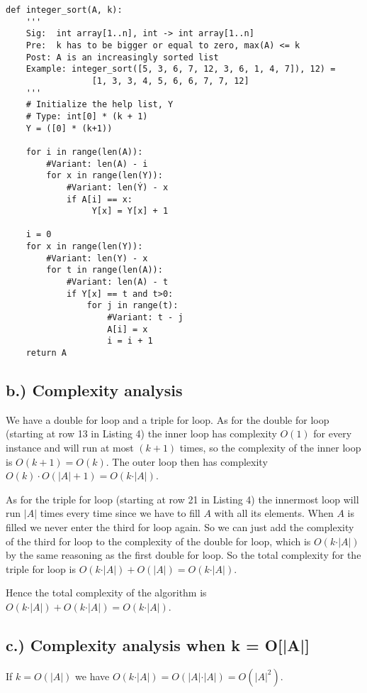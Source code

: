 \documentclass{article}
\begin{document}
\begin{lstlisting}[caption={Code for Integer Sort},captionpos=b]
def integer_sort(A, k):
    '''
    Sig:  int array[1..n], int -> int array[1..n]
    Pre:  k has to be bigger or equal to zero, max(A) <= k
    Post: A is an increasingly sorted list 
    Example: integer_sort([5, 3, 6, 7, 12, 3, 6, 1, 4, 7]), 12) = 
                 [1, 3, 3, 4, 5, 6, 6, 7, 7, 12]
    '''
    # Initialize the help list, Y
    # Type: int[0] * (k + 1)
    Y = ([0] * (k+1))
 
    for i in range(len(A)):
        #Variant: len(A) - i
        for x in range(len(Y)):
            #Variant: len(Ý) - x
            if A[i] == x:
                 Y[x] = Y[x] + 1

    i = 0
    for x in range(len(Y)):
        #Variant: len(Y) - x
        for t in range(len(A)):
            #Variant: len(A) - t
            if Y[x] == t and t>0:
                for j in range(t):
                    #Variant: t - j
                    A[i] = x
                    i = i + 1
  	return A
\end{lstlisting}

\newpage
\subsection*{b.) Complexity analysis}
We have a double for loop and a triple for loop. As for the double for loop (starting at row 13 in Listing 4) the inner loop has complexity $O(1)$ for every instance and will run at most $(k+1)$ times, so the complexity of the inner loop is $O(k+1) = O(k)$. The outer loop then has complexity $O(k)\cdot O(\vert A \vert + 1) = O(k\cdot \vert A \vert)$. 

As for the triple for loop (starting at row 21 in Listing 4) the innermost loop will run $\vert A\vert$ times every time since we have to fill $A$ with all its elements. When $A$ is filled we never enter the third for loop again. So we can just add the complexity of the third for loop to the complexity of the double for loop, which is $O(k\cdot \vert A \vert)$ by the same reasoning as the first double for loop. So the total complexity for the triple for loop is $O(k\cdot \vert A \vert) + O(\vert A\vert) = O(k\cdot \vert A \vert)$. 

Hence the total complexity of the algorithm is $O(k\cdot \vert A \vert) + O(k\cdot \vert A \vert) = O(k\cdot \vert A \vert)$. 
\subsection*{c.) Complexity analysis when k = O[|A|]}
If $k = O(|A|)$ we have $O(k\cdot \vert A \vert) = O(\vert A \vert \cdot \vert A \vert) = O(\vert A \vert^2)$.
\end{document}

